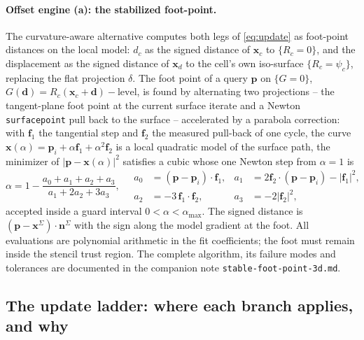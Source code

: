 \documentclass[preprint,3p,11pt]{elsarticle}
\newcommand{\psilev}{\psi}
\newcommand{\xc}{\mathbf{x}_c}
\newcommand{\xd}{\mathbf{x}_d}
\newcommand{\nv}{\mathbf{n}}
\begin{document}
\paragraph{Offset engine (a): the stabilized foot-point.}
The curvature-aware alternative computes both legs of \eqref{eq:update} as
foot-point distances on the local model: $d_c$ as the signed distance of
$\xc$ to $\{R_c=0\}$, and the displacement as the signed distance of $\xd$ to
the cell's own iso-surface $\{R_c=\psilev_c\}$, replacing the flat projection
$\delta$. The foot point of a query $\mathbf p$ on $\{G=0\}$,
$G(\mathbf d)=R_c(\xc+\mathbf d)-\text{level}$, is found by alternating two
projections -- the tangent-plane foot point at the current surface iterate and
a Newton \texttt{surfacepoint} pull back to the surface -- accelerated by a
parabola correction: with $\mathbf f_1$ the tangential step and $\mathbf f_2$
the measured pull-back of one cycle, the curve
$\mathbf x(\alpha)=\mathbf p_i+\alpha\mathbf f_1+\alpha^2\mathbf f_2$ is a
local quadratic model of the surface path, the minimizer of
$\lvert\mathbf p-\mathbf x(\alpha)\rvert^2$ satisfies a cubic whose one Newton
step from $\alpha=1$ is
\begin{equation}
  \alpha=1-\frac{a_0+a_1+a_2+a_3}{a_1+2a_2+3a_3},
  \quad
  \begin{aligned}
  a_0&=(\mathbf p-\mathbf p_i)\cdot\mathbf f_1, &
  a_1&=2\mathbf f_2\cdot(\mathbf p-\mathbf p_i)-\lvert\mathbf f_1\rvert^2,\\
  a_2&=-3\,\mathbf f_1\cdot\mathbf f_2, &
  a_3&=-2\lvert\mathbf f_2\rvert^2,
  \end{aligned}
\end{equation}
accepted inside a guard interval $0<\alpha<\alpha_{\max}$. The signed distance
is $(\mathbf p-\mathbf x^{\Sigma})\cdot\nv^{\Sigma}$ with the sign along the
model gradient at the foot. All evaluations are polynomial arithmetic in the
fit coefficients; the foot must remain inside the stencil trust region. The
complete algorithm, its failure modes and tolerances are documented in the
companion note \texttt{stable-foot-point-3d.md}.

\subsection{The update ladder: where each branch applies, and why}
\label{sec:ladder}
\end{document}
